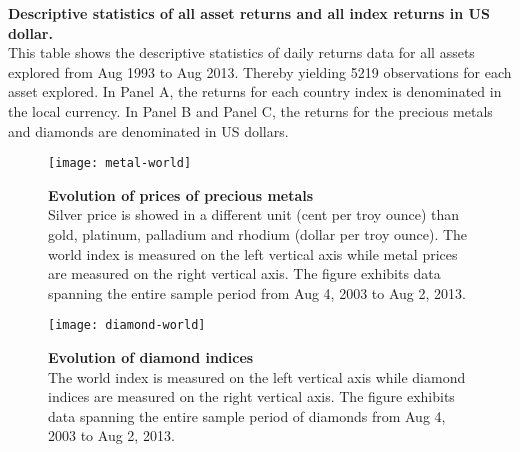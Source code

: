 \documentclass[preprint,authoryear,11pt]{elsarticle}
\begin{document}
\begin{table}[htp!]
\scriptsize \centering
\captionsetup{labelfont=bf,font=footnotesize,skip=0.1cm}
\caption{\textbf{Descriptive statistics of all asset returns and all index returns in US dollar.}\\
This table shows the descriptive statistics of daily returns data for all assets explored from Aug 1993 to Aug 2013.  Thereby yielding 5219 observations for each asset explored. In Panel A, the returns for each country index is denominated in the local currency.  In Panel B and Panel C, the returns for the precious metals and diamonds are denominated in US dollars.} \label{tab:data_descrip}
\begin{threeparttable}

\end{threeparttable}
\end{table}


\begin{figure}
\centering
\texttt{[image: metal-world]}
\captionsetup{labelfont=bf,font=footnotesize,skip=0.1cm}
\caption{\textbf{Evolution of prices of precious metals}\\
Silver price is showed in a different unit (cent per troy ounce) than gold, platinum, palladium and rhodium (dollar per troy ounce). The world index is measured on the left vertical axis while metal prices are measured on the right vertical axis. The figure exhibits data spanning the entire sample period from Aug 4, 2003 to Aug 2, 2013.}
\label{fig:metal-world}
\end{figure}

\begin{figure}
\centering
\captionsetup{labelfont=bf,font=footnotesize,skip=0.1cm}
\texttt{[image: diamond-world]}
\caption{\textbf{Evolution of diamond indices }\\
The world index is measured on the left vertical axis while diamond indices are measured on the right vertical axis. The figure exhibits data spanning the entire sample period of diamonds from Aug 4, 2003 to Aug 2, 2013.}
\label{fig:diamond-world}
\end{figure}
\end{document}
